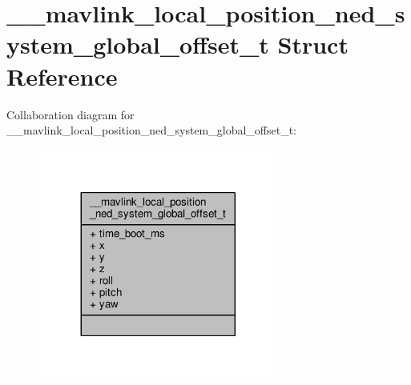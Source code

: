 \hypertarget{struct____mavlink__local__position__ned__system__global__offset__t}{\section{\+\_\+\+\_\+mavlink\+\_\+local\+\_\+position\+\_\+ned\+\_\+system\+\_\+global\+\_\+offset\+\_\+t Struct Reference}
\label{struct____mavlink__local__position__ned__system__global__offset__t}
}


Collaboration diagram for \+\_\+\+\_\+mavlink\+\_\+local\+\_\+position\+\_\+ned\+\_\+system\+\_\+global\+\_\+offset\+\_\+t\+:
\nopagebreak
\begin{figure}[H]
\begin{center}
\leavevmode
\includegraphics[width=224pt]{struct____mavlink__local__position__ned__system__global__offset__t__coll__graph}
\end{center}
\end{figure}
